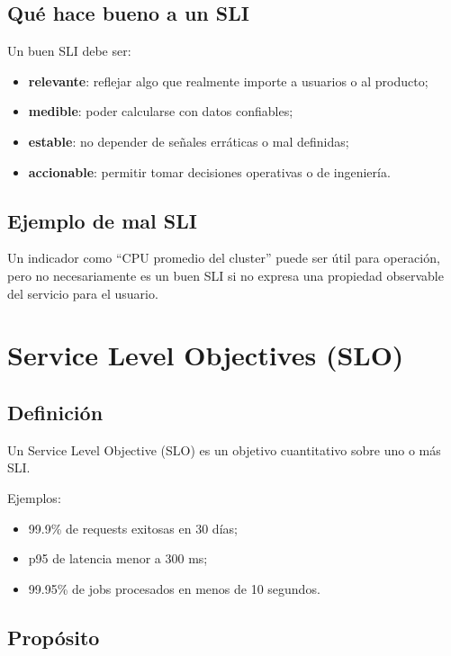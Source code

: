 \documentclass[variant=apuntes,cover=institutional,mode=screen]{ua-engineering-v6-article}
\begin{document}
\subsection{Qué hace bueno a un SLI}

Un buen SLI debe ser:

\begin{itemize}
\item \textbf{relevante}: reflejar algo que realmente importe a usuarios o al producto;
\item \textbf{medible}: poder calcularse con datos confiables;
\item \textbf{estable}: no depender de señales erráticas o mal definidas;
\item \textbf{accionable}: permitir tomar decisiones operativas o de ingeniería.
\end{itemize}

\subsection{Ejemplo de mal SLI}

Un indicador como “CPU promedio del cluster” puede ser útil para operación, pero no necesariamente es un buen SLI si no expresa una propiedad observable del servicio para el usuario.

\section{Service Level Objectives (SLO)}

\subsection{Definición}

Un Service Level Objective (SLO) es un objetivo cuantitativo sobre uno o más SLI.

Ejemplos:
\begin{itemize}
\item 99.9\% de requests exitosas en 30 días;
\item p95 de latencia menor a 300 ms;
\item 99.95\% de jobs procesados en menos de 10 segundos.
\end{itemize}

\subsection{Propósito}
\end{document}
